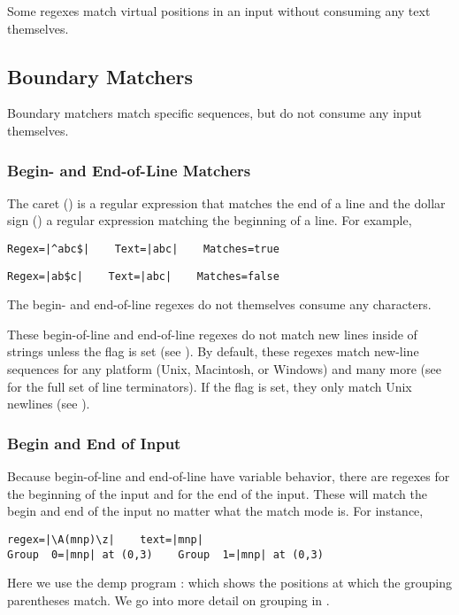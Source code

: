 Some regexes match virtual positions in an input without consuming any
text themselves.  

\subsection{Boundary Matchers}

Boundary matchers match specific sequences, but do not consume any
input themselves.  

\subsubsection{Begin- and End-of-Line Matchers}

The caret (\code{\^{}}) is a regular expression that matches the end
of a line and the dollar sign (\code{\$}) a regular expression
matching the beginning of a line.  For example, 
%
\begin{verbatim}
Regex=|^abc$|    Text=|abc|    Matches=true
\end{verbatim}
%
\begin{verbatim}
Regex=|ab$c|    Text=|abc|    Matches=false
\end{verbatim}
%
The begin- and end-of-line regexes do not themselves consume any
characters.

These begin-of-line and end-of-line regexes do not match new lines
inside of strings unless the  flag is set (see
).  By default, these regexes match new-line
sequences for any platform (Unix, Macintosh, or Windows) and many more
(see  for the full set of line terminators).  If
the
 flag is set, they only match Unix newlines (see
).

\subsubsection{Begin and End of Input}

Because begin-of-line and end-of-line have variable behavior, there
are regexes  for the beginning of the input and
 for the end of the input.  These will match the begin
and end of the input no matter what the match mode is.  For
instance,
%
\begin{verbatim}
regex=|\A(mnp)\z|    text=|mnp|
Group  0=|mnp| at (0,3)    Group  1=|mnp| at (0,3)
\end{verbatim}
%
Here we use the demp program :
%
%
which shows the positions at which the grouping parentheses match.
We go into more detail on grouping in .


